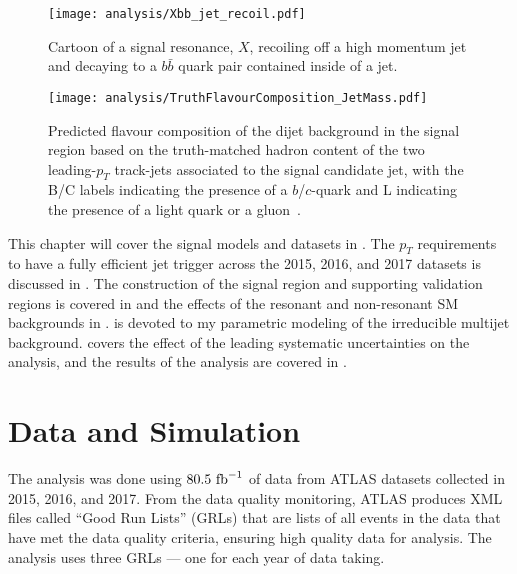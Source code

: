 \begin{figure}[htbp]
 \centering
 \texttt{[image: analysis/Xbb\_jet\_recoil.pdf]}
 \caption[Cartoon of a signal resonance recoiling of a high momentum jet.]{%
  Cartoon of a signal resonance, $X$, recoiling off a high momentum jet and decaying to a $b\bar{b}$ quark pair contained inside of a \largeR{} jet.}
 \label{fig:Xbb_jet_recoil}
\end{figure}

\begin{figure}[htbp]
 \centering
 \texttt{[image: analysis/TruthFlavourComposition\_JetMass.pdf]}
 \caption[Predicted flavour composition of the dijet background in the signal region.]{%
  Predicted flavour composition of the dijet background in the signal region based on the truth-matched hadron content of the two leading-$p_{T}$ track-jets associated to the signal candidate \largeR{} jet, with the B/C labels indicating the presence of a $b$/$c$-quark and L indicating the presence of a light quark or a gluon~\cite{ATLAS-CONF-2018-052}.}
 \label{fig:SR_flavour_composition}
\end{figure}

This chapter will cover the signal models and datasets in .
The $p_{T}$ requirements to have a fully efficient \largeR{} jet trigger across the 2015, 2016, and 2017 datasets is discussed in .
The construction of the signal region and supporting validation regions is covered in  and the effects of the resonant and non-resonant SM backgrounds in .
 is devoted to my parametric modeling of the irreducible multijet background.
 covers the effect of the leading systematic uncertainties on the analysis, and the results of the analysis are covered in .

\clearpage
\section{Data and Simulation}\label{sec:data_and_simulation}

The analysis was done using $80.5~\mathrm{fb}^{-1}$ of data from ATLAS datasets collected in 2015, 2016, and 2017.
From the data quality monitoring, ATLAS produces XML files called ``Good Run Lists'' (GRLs) that are lists of all events in the data that have met the data quality criteria, ensuring high quality data for analysis.
The analysis uses three GRLs --- one for each year of data taking.

